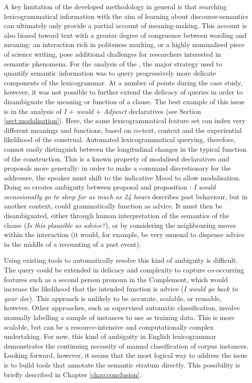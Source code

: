 A key limitation of the developed methodology in general is that searching lexicogrammatical information with the aim of learning about \glspl{discourse-semantic} can ultimately only provide a partial account of meaning\hyp{}making. This account is also biased toward text with a greater degree of congruence between wording and meaning: an interaction rich in politeness marking, or a highly nominalised piece of science writing, pose additional challenges for researchers interested in semantic phenomena. For the analysis of the , the major strategy used to quantify semantic information was to query progressively more delicate components of the \gls{lexicogrammar}. At a number of points during the case study, however, it was not possible to further extend the delicacy of queries in order to disambiguate the meaning or function of a clause. The best example of this issue is in the analysis of \emph{I $+$ would $+$ Adjunct} declaratives (see Section \ref{sect:modalisation}). Here, the same lexicogrammatical feature set can index very different meanings and functions, based on co\hyp{}text, context and the experiential likelihood of the construal. Automated lexicogrammatical querying, therefore, cannot easily distinguish between the longitudinal changes in the typical function of the construction. This is a known property of modalised declaratives and proposals more generally: in order to make a command discretionary for the addressee, the speaker must shift to the indicative Mood to allow modalisation. Doing so creates ambiguity between proposal and proposition \cite{halliday_introduction_2004}: \emph{I would occassionally go to sleep for as much as 24 hours} describes past behaviour, but in another context, could grammatically function as advice. It must then be disambiguated, either through human interpretation of the semantics of the clause (\emph{Is this plausible as advice?}), or by considering the neighbouring moves within the interaction (it would, for example, be very unusual to dispense advice in the middle of a recounting of a past event).

Using existing tools to automatically resolve this kind of ambiguity is difficult. The query could be extended in delicacy and complexity to capture co\hyp{}occurring features such as a second person pronoun in the Complement, which would increase the likelihood that the intended function is advice (\emph{I would go back to your doc}). This approach is unlikely to be accurate, scalable, or reusable, however. Other approaches, such as supervised automatic classification, involve manually labelling a sample of instances to use as training data. This is more scalable, but can be a resource\hyp{}intensive and computationally complex undertaking. For now, this kind of ambiguity in English \gls{lexicogrammar} demonstrates the continuing necessity of manual classification of corpus instances. Looking forward, however, it seems that the most logical way to address the issue is to build tools that annotate the semantic stratum directly. This possibility is briefly described in Chapter \ref{chap:conclusion}.


